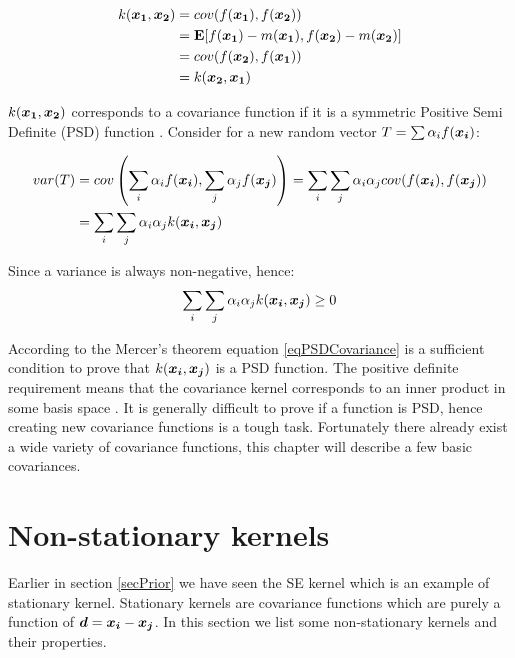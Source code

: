 \begin{align}\label{eqSymmetricCovariance}
    k(\boldsymbol{x_{1}}, \boldsymbol{x_{2}}) & = cov(f(\boldsymbol{x_{1}}), f(\boldsymbol{x_{2}})) \\ 
                                & = \mathbf{E}[f(\boldsymbol{x_1}) - m(\boldsymbol{x_1}), f(\boldsymbol{x_2}) - m(\boldsymbol{x_2})] \\
                                & = cov(f(\boldsymbol{x_{2}}), f(\boldsymbol{x_{1}})) \\ 
                                & =  k(\boldsymbol{x_{2}}, \boldsymbol{x_{1}})
\end{align}

$k(\boldsymbol{x_{1}}, \boldsymbol{x_{2}})$ corresponds to a covariance function if it is a symmetric Positive Semi Definite (PSD) function \cite{mercer1909functions, loeve1978probability, durrande2001etude}. Consider for a new random vector $T = \sum \alpha_{i}f(\boldsymbol{x_{i}})$:

\begin{equation}\label{eqDerivePSDCovariance}
    \begin{aligned}
        var(T) & = cov\left ( \sum_{i} \alpha_{i}f(\boldsymbol{x_{i}}), \sum_{j} \alpha_{j}f(\boldsymbol{x_{j}}) \right ) = \sum_{i}\sum_{j}\alpha_{i}\alpha_{j}cov(f(\boldsymbol{x_{i}}), f(\boldsymbol{x_{j}})) \\
& = \sum_{i}\sum_{j}\alpha_{i}\alpha_{j}k(\boldsymbol{x_{i}}, \boldsymbol{x_{j}})
    \end{aligned}
\end{equation}

Since a variance is always non-negative, hence:
\begin{equation}\label{eqPSDCovariance}
\sum_{i}\sum_{j}\alpha_{i}\alpha_{j}k(\boldsymbol{x_{i}}, \boldsymbol{x_{j}}) \geq 0
\end{equation}

According to the Mercer's theorem  \cite{mercer1909functions} equation \ref{eqPSDCovariance} is a sufficient condition to prove that $k(\boldsymbol{x_{i}}, \boldsymbol{x_{j}})$ is a PSD function. The positive definite requirement means that the covariance kernel corresponds to an inner product in some basis space \cite{bishop2006pattern}. It is generally difficult to prove if a function is PSD, hence creating new covariance functions is a tough task. Fortunately there already exist a wide variety of covariance functions, this chapter will describe a few basic covariances. 

\section{Non-stationary kernels}\label{secNonStationaryKernels}
Earlier in section \ref{secPrior} we have seen the SE kernel which is an example of stationary kernel. Stationary kernels are covariance functions which are purely a function of $\boldsymbol{d} = \boldsymbol{x_{i}} - \boldsymbol{x_{j}}$. In this section we list some non-stationary kernels and their properties. 

